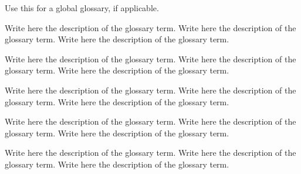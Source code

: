 %
%


Use this for a global glossary, if applicable.

 Write here the description of the glossary term. Write here the description of the glossary term. Write here the description of the glossary term.

 Write here the description of the glossary term. Write here the description of the glossary term. Write here the description of the glossary term.

 Write here the description of the glossary term. Write here the description of the glossary term. Write here the description of the glossary term.

 Write here the description of the glossary term. Write here the description of the glossary term. Write here the description of the glossary term.

 Write here the description of the glossary term. Write here the description of the glossary term. Write here the description of the glossary term.